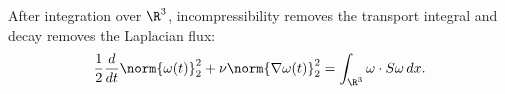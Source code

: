 After integration over \(\R^3\), incompressibility removes the transport integral and decay removes the Laplacian flux:
\[
  \frac12\frac{d}{dt}\norm{\omega(t)}_2^2
  +
  \nu\norm{\nabla\omega(t)}_2^2
  =
  \int_{\R^3}\omega\cdot S\omega\,dx.
\]
